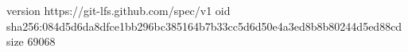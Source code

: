 version https://git-lfs.github.com/spec/v1
oid sha256:084d5d6da8dfce1bb296bc385164b7b33cc5d6d50e4a3ed8b8b80244d5ed88cd
size 69068
